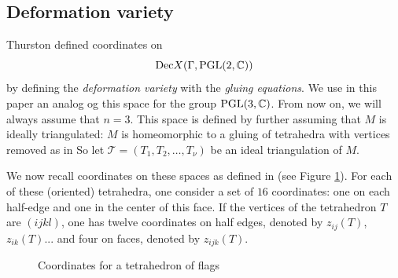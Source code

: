 \subsection{Deformation variety}\label{ss:deformationvariety}

Thurston \cite{Thurston} defined coordinates on 
$$\mathrm{Dec}X(\Gamma,\textrm{PGL}(2,\mathbb{C}))
$$ by defining the \emph{deformation variety} with the \emph{gluing equations}. We use in this paper an analog og this space for the group $\textrm{PGL}(3,\mathbb{C})$. From now on, we will always assume that $n=3$. This space is defined by further assuming that $M$ is ideally triangulated: $M$ is homeomorphic to a gluing of tetrahedra with vertices removed as in \cite{Thurston, BFGKR}
So let $\mathcal T=(T_1,T_2,\ldots,T_\nu)$ be an ideal triangulation of $M$.

We now recall coordinates on these spaces as defined in \cite{BFG} (see Figure \ref{coordinates}).  For each of these (oriented) tetrahedra, one consider a set of $16$ coordinates: one on each half-edge and one in the center of this face. If the vertices of the tetrahedron $T$ are $(ijkl)$, one has twelve coordinates on half edges, denoted by $z_{ij}(T)$, $z_{ik}(T)$... and four on faces, denoted by $z_{ijk}(T)$.

\begin{figure}

\caption{Coordinates for a tetrahedron of flags}\label{coordinates}
\end{figure}

